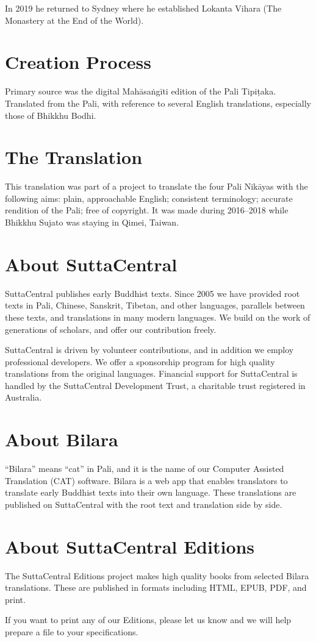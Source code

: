 \documentclass[12pt,openany]{book}%
\begin{document}
In 2019 he returned to Sydney where he established Lokanta Vihara (The Monastery at the End of the World). 

\section*{Creation Process}

Primary source was the digital \textsanskrit{Mahāsaṅgīti} edition of the Pali \textsanskrit{Tipiṭaka}. Translated from the Pali, with reference to several English translations, especially those of Bhikkhu Bodhi.

\section*{The Translation}

This translation was part of a project to translate the four Pali \textsanskrit{Nikāyas} with the following aims: plain, approachable English; consistent terminology; accurate rendition of the Pali; free of copyright. It was made during 2016–2018 while Bhikkhu Sujato was staying in Qimei, Taiwan.

\section*{About SuttaCentral}

SuttaCentral publishes early Buddhist texts. Since 2005 we have provided root texts in Pali, Chinese, Sanskrit, Tibetan, and other languages, parallels between these texts, and translations in many modern languages. We build on the work of generations of scholars, and offer our contribution freely.

SuttaCentral is driven by volunteer contributions, and in addition we employ professional developers. We offer a sponsorship program for high quality translations from the original languages. Financial support for SuttaCentral is handled by the SuttaCentral Development Trust, a charitable trust registered in Australia.

\section*{About Bilara}

“Bilara” means “cat” in Pali, and it is the name of our Computer Assisted Translation (CAT) software. Bilara is a web app that enables translators to translate early Buddhist texts into their own language. These translations are published on SuttaCentral with the root text and translation side by side.

\section*{About SuttaCentral Editions}

The SuttaCentral Editions project makes high quality books from selected Bilara translations. These are published in formats including HTML, EPUB, PDF, and print.

If you want to print any of our Editions, please let us know and we will help prepare a file to your specifications.

%
\end{document}
